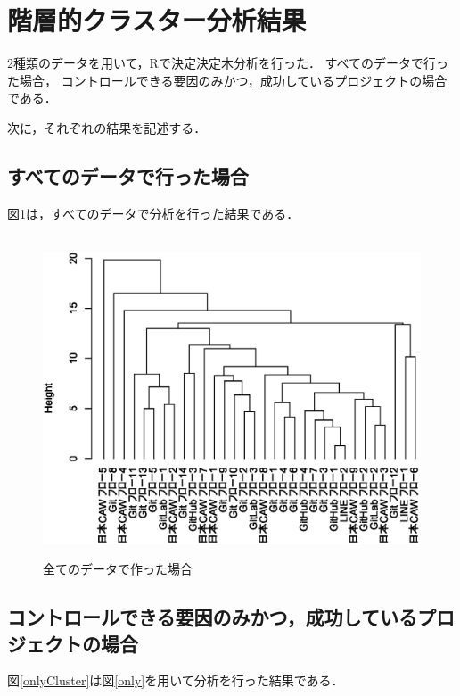 \section{階層的クラスター分析結果}


2種類のデータを用いて，Rで決定決定木分析を行った．
すべてのデータで行った場合，
コントロールできる要因のみかつ，成功しているプロジェクトの場合である．

次に，それぞれの結果を記述する．
\subsection{すべてのデータで行った場合}
図\ref{allCluster}は，すべてのデータで分析を行った結果である．
\begin{figure}[H]
\centering　
\includegraphics[width=13cm]{allCluster.eps}
\caption{全てのデータで作った場合}\label{allCluster}
\end{figure}

\subsection{コントロールできる要因のみかつ，成功しているプロジェクトの場合}
図\ref{onlyCluster}は図\ref{only}を用いて分析を行った結果である．

